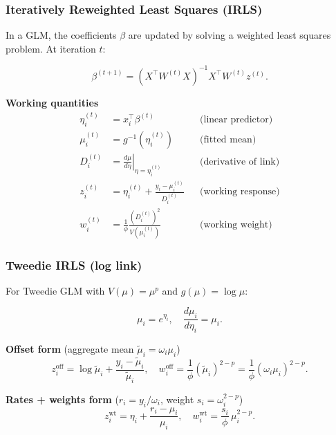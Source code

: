 \documentclass[10pt,aspectratio=169,xcolor={dvipsnames},usepdftitle=false]{beamer}
\begin{document}
\begin{frame}
\frametitle{Iteratively Reweighted Least Squares (IRLS)}

\small
In a GLM, the coefficients $\beta$ are updated by solving a weighted least squares problem.
At iteration $t$:

\[
\beta^{(t+1)}
= (X^\top W^{(t)} X)^{-1} X^\top W^{(t)} z^{(t)}.
\]

\textbf{Working quantities}
\begin{align*}
\eta_i^{(t)} &= x_i^\top \beta^{(t)} & & \text{(linear predictor)} \\
\mu_i^{(t)} &= g^{-1}(\eta_i^{(t)}) & & \text{(fitted mean)} \\
D_i^{(t)} &= \left. \tfrac{d \mu}{d \eta} \right|_{\eta=\eta_i^{(t)}} & & \text{(derivative of link)} \\
z_i^{(t)} &= \eta_i^{(t)} + \tfrac{y_i - \mu_i^{(t)}}{D_i^{(t)}} & & \text{(working response)} \\
w_i^{(t)} &= \tfrac{1}{\phi} \frac{(D_i^{(t)})^2}{V(\mu_i^{(t)})} & & \text{(working weight)}
\end{align*}


\end{frame}


\begin{frame}
\frametitle{Tweedie IRLS (log link)}

\small
For Tweedie GLM with $V(\mu)=\mu^p$ and $g(\mu)=\log \mu$:

\[
\mu_i = e^{\eta_i}, \quad
\frac{d \mu_i}{d \eta_i} = \mu_i.
\]

\textbf{Offset form} (aggregate mean $\tilde{\mu}_i=\omega_i \mu_i$)
\[
z_i^{\text{off}} = \log \tilde{\mu}_i + \frac{y_i-\tilde{\mu}_i}{\tilde{\mu}_i}, \quad
w_i^{\text{off}} = \frac{1}{\phi} (\tilde{\mu}_i)^{2-p}
= \frac{1}{\phi}(\omega_i \mu_i)^{2-p}.
\]


\textbf{Rates + weights form} ($r_i=y_i/\omega_i$, weight $s_i=\omega_i^{2-p}$)
\[
z_i^{\text{wt}} = \eta_i + \frac{r_i-\mu_i}{\mu_i}, \quad
w_i^{\text{wt}} = \frac{s_i}{\phi}\, \mu_i^{2-p}.
\]
\end{frame}
\end{document}
